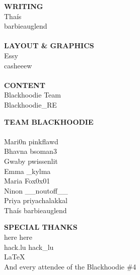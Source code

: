 \begin{multicols}{3}\footnotesize
\setlength{\columnseprule}{0pt}
\begin{center}
\textbf{WRITING}\\
Tha\'is\\
\faTwitter \hspace{0.05cm} barbieauglend\\
~\\
\textbf{LAYOUT \& GRAPHICS}\\
Essy\\
\faTwitter \hspace{0.05cm} casheeew\\
~\\
\textbf{CONTENT}\\
Blackhoodie Team\\
\faTwitter \hspace{0.05cm} Blackhoodie\_RE\\
\end{center}
\columnbreak
\begin{center}
\textbf{TEAM BLACKHOODIE}\\
~\\
Mari0n \hspace{0.05cm} \faTwitter \hspace{0.05cm} pinkflawd\\
Bhavna \hspace{0.05cm} \faTwitter \hspace{0.05cm} bsoman3\\
Gwaby \hspace{0.05cm} \faTwitter \hspace{0.05cm} pwissenlit\\
Emma \hspace{0.05cm} \faTwitter \hspace{0.05cm} \_kylma\\
Maria \hspace{0.05cm} \faTwitter \hspace{0.05cm} Fox0x01\\
Ninon \hspace{0.05cm} \faTwitter \hspace{0.05cm} \_\_noutoff\_\_\\
Priya \hspace{0.05cm} \faTwitter \hspace{0.05cm} priyachalakkal\\
Tha\'is \hspace{0.05cm} \faTwitter \hspace{0.05cm} barbieauglend\\
\end{center}
\columnbreak
\begin{center}
\textbf{SPECIAL THANKS}\\
here \hspace{0.05cm} \faTwitter \hspace{0.05cm} here\\
hack.lu \hspace{0.05cm} \faTwitter \hspace{0.05cm} hack\_lu\\
\LaTeX\\
And every attendee of the Blackhoodie \#4
\end{center}
\end{multicols}
\vspace{-6em}

